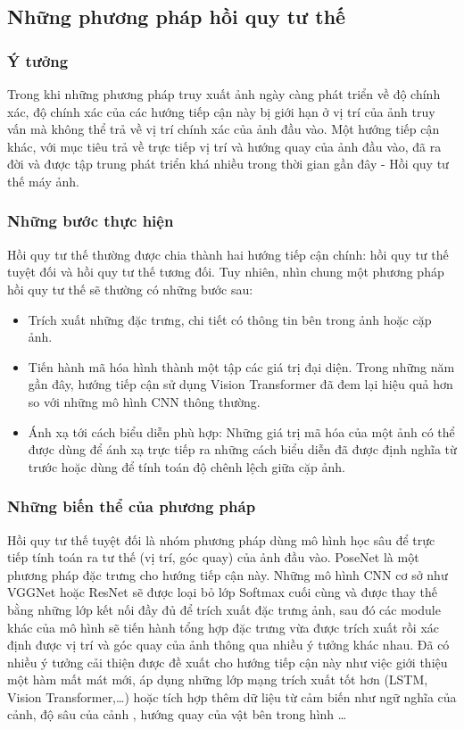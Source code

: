 \subsection{Những phương pháp hồi quy tư thế}
\subsubsection*{Ý tưởng}

Trong khi những phương pháp truy xuất ảnh ngày càng phát triển về độ chính xác, độ chính xác của các hướng tiếp cận này bị giới hạn ở vị trí của ảnh truy vấn mà không thể trả về vị trí chính xác của ảnh đầu vào. Một hướng tiếp cận khác, với mục tiêu trả về trực tiếp vị trí và hướng quay của ảnh đầu vào, đã ra đời và được tập trung phát triển khá nhiều trong thời gian gần đây - Hồi quy tư thế máy ảnh.

\subsubsection*{Những bước thực hiện}

Hồi quy tư thế thường được chia thành hai hướng tiếp cận chính: hồi quy tư thế tuyệt đối và hồi quy tư thế tương đối. Tuy nhiên, nhìn chung một phương pháp hồi quy tư thế sẽ thường có những bước sau:
\begin{itemize}
    \item Trích xuất những đặc trưng, chi tiết có thông tin bên trong ảnh hoặc cặp ảnh.
    \item Tiến hành mã hóa hình thành một tập các giá trị đại diện. Trong những năm gần đây, hướng tiếp cận sử dụng Vision Transformer đã đem lại hiệu quả hơn so với những mô hình CNN thông thường.
    \item Ánh xạ tới cách biểu diễn phù hợp: Những giá trị mã hóa của một ảnh có thể được dùng để ánh xạ trực tiếp ra những cách biểu diễn đã được định nghĩa từ trước hoặc dùng để tính toán độ chênh lệch giữa cặp ảnh.
\end{itemize}

\subsubsection*{Những biến thể của phương pháp}

Hồi quy tư thế tuyệt đối là nhóm phương pháp dùng mô hình học sâu để trực tiếp tính toán ra tư thế (vị trí, góc quay) của ảnh đầu vào. PoseNet \cite{kendall2016posenet} là một phương pháp đặc trưng cho hướng tiếp cận này. Những mô hình CNN cơ sở như VGGNet hoặc ResNet sẽ được loại bỏ lớp Softmax cuối cùng và được thay thế bằng những lớp kết nối đầy đủ để trích xuất đặc trưng ảnh, sau đó các module khác của mô hình sẽ tiến hành tổng hợp đặc trưng vừa được trích xuất rồi xác định được vị trí và góc quay của ảnh thông qua nhiều ý tưởng khác nhau. Đã có nhiều ý tưởng cải thiện được đề xuất cho hướng tiếp cận này như việc giới thiệu một hàm mất mát mới, áp dụng những lớp mạng trích xuất tốt hơn (LSTM, Vision Transformer,\dots) \cite{keetha2023anyloc} hoặc tích hợp thêm dữ liệu từ cảm biến như ngữ nghĩa của cảnh, độ sâu của cảnh \cite{yan2022crossloc}, hướng quay của vật bên trong hình \cite{liu2019lending} \dots


